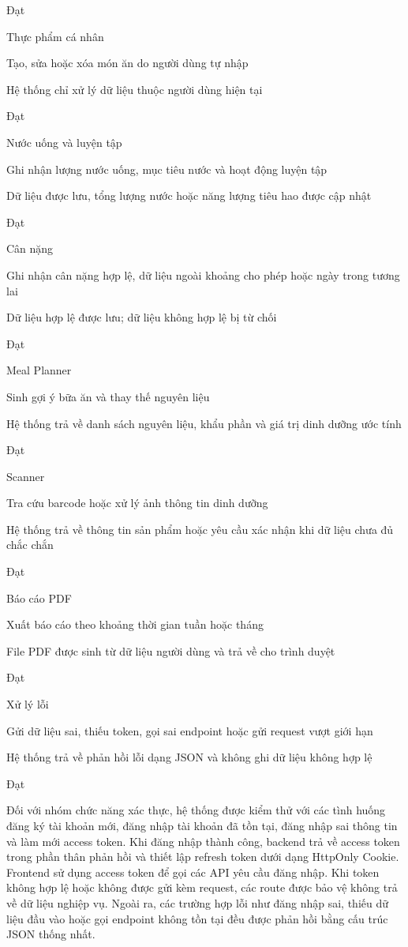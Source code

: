 Đạt

Thực phẩm cá nhân

Tạo, sửa hoặc xóa món ăn do người dùng tự nhập

Hệ thống chỉ xử lý dữ liệu thuộc người dùng hiện tại

Đạt

Nước uống và luyện tập

Ghi nhận lượng nước uống, mục tiêu nước và hoạt động luyện tập

Dữ liệu được lưu, tổng lượng nước hoặc năng lượng tiêu hao được cập nhật

Đạt

Cân nặng

Ghi nhận cân nặng hợp lệ, dữ liệu ngoài khoảng cho phép hoặc ngày trong tương lai

Dữ liệu hợp lệ được lưu; dữ liệu không hợp lệ bị từ chối

Đạt

Meal Planner

Sinh gợi ý bữa ăn và thay thế nguyên liệu

Hệ thống trả về danh sách nguyên liệu, khẩu phần và giá trị dinh dưỡng ước tính

Đạt

Scanner

Tra cứu barcode hoặc xử lý ảnh thông tin dinh dưỡng

Hệ thống trả về thông tin sản phẩm hoặc yêu cầu xác nhận khi dữ liệu chưa đủ chắc chắn

Đạt

Báo cáo PDF

Xuất báo cáo theo khoảng thời gian tuần hoặc tháng

File PDF được sinh từ dữ liệu người dùng và trả về cho trình duyệt

Đạt

Xử lý lỗi

Gửi dữ liệu sai, thiếu token, gọi sai endpoint hoặc gửi request vượt giới hạn

Hệ thống trả về phản hồi lỗi dạng JSON và không ghi dữ liệu không hợp lệ

Đạt

Đối với nhóm chức năng xác thực, hệ thống được kiểm thử với các tình huống đăng ký tài khoản mới, đăng nhập tài khoản đã tồn tại, đăng nhập sai thông tin và làm mới access token. Khi đăng nhập thành công, backend trả về access token trong phần thân phản hồi và thiết lập refresh token dưới dạng HttpOnly Cookie. Frontend sử dụng access token để gọi các API yêu cầu đăng nhập. Khi token không hợp lệ hoặc không được gửi kèm request, các route được bảo vệ không trả về dữ liệu nghiệp vụ. Ngoài ra, các trường hợp lỗi như đăng nhập sai, thiếu dữ liệu đầu vào hoặc gọi endpoint không tồn tại đều được phản hồi bằng cấu trúc JSON thống nhất.

